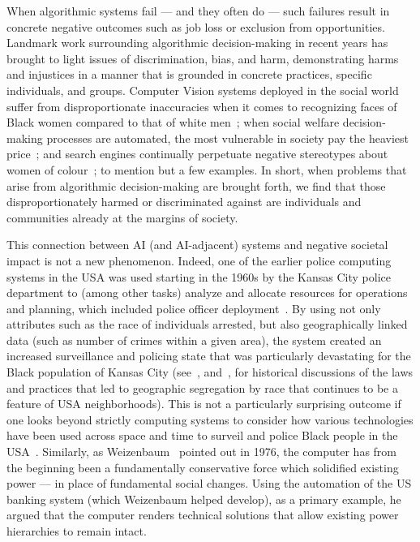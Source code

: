 \documentclass[manuscript]{acmart}
\begin{document}
When algorithmic systems fail --- and they often do --- such failures result in concrete negative outcomes such as job loss or exclusion from opportunities. Landmark work surrounding algorithmic decision-making in recent years has brought to light issues of discrimination, bias, and harm, demonstrating harms and injustices in a manner that is grounded in concrete practices, specific individuals, and groups. Computer Vision systems deployed in the social world suffer from disproportionate inaccuracies when it comes to recognizing faces of Black women compared to that of white men~\cite{buolamwini2018gender}; when social welfare decision-making processes are automated, the most vulnerable in society pay the heaviest price~\cite{eubanks2018automating}; and search engines continually perpetuate negative stereotypes about women of colour~\cite{noble2018algorithms}; to mention but a few examples. In short, when problems that arise from algorithmic decision-making are brought forth, we find that those disproportionately harmed or discriminated against are individuals and communities already at the margins of society. 

This connection between AI (and AI-adjacent) systems and negative societal impact is not a new phenomenon. Indeed, one of the earlier police computing systems in the USA was used starting in the 1960s by the Kansas City police department to (among other tasks) analyze and allocate resources for operations and planning, which included police officer deployment~\cite{mcilwain2019black}. By using not only attributes such as the race of individuals arrested, but also geographically linked data (such as number of crimes within a given area), the system created an increased surveillance and policing state that was particularly devastating for the Black population of Kansas City (see~\cite{rothstein2017color}, and~\cite{taylor2019race}, for historical discussions of the laws and practices that led to geographic segregation by race that continues to be a feature of USA neighborhoods). This is not a particularly surprising outcome if one looks beyond strictly computing systems to consider how various technologies have been used across space and time to surveil and police Black people in the USA~\cite{browne2015dark}. 
Similarly, as Weizenbaum~\cite {weizenbaum1976computer} pointed out in 1976, the computer has from the beginning been a fundamentally conservative force which solidified existing power --- in place of fundamental social changes. Using the automation of the US banking system (which Weizenbaum helped develop), as a primary example, he argued that the computer renders technical solutions that allow existing power hierarchies to remain intact. 
\end{document}
